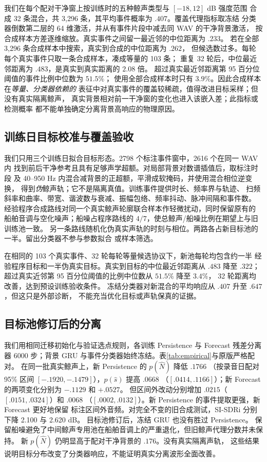\documentclass[conference]{IEEEtran}
\begin{document}
我们在每个配对干净窗上按训练时的五种鲸声类型与 $[-18,12]$ dB 强度范围
合成 32 条混合，共 3,296 条，其平均事件概率为 $.407$。覆盖代理指标取冻结
分类器倒数第二层的 64 维激活，并从有事件片段中减去同 WAV 的干净背景激活，
按合成样本方差逐维缩放。真实事件之间留一最近邻的中位距离为 $.233$。
若在全部 3,296 条合成样本中搜索，真实到合成的中位距离为 $.262$，
但候选数过多。每轮每个真实事件只取一条合成样本，凑成等量的 103 条；
重复 32 轮后，中位最近邻距离为 $.483$，是真实到真实距离的 $2.08$ 倍。
超过真实最近邻距离第 95 百分位阈值的事件比例中位数为 $51.5\%$；
使用全部合成样本时只有 $3.9\%$。因此合成样本在\emph{等量、分类器依赖的}
表征中对真实事件的覆盖较稀疏，值得改进目标采样；但没有真实隔离鲸声，
真实背景相对前一干净窗的变化也进入该嵌入差；此指标或检测概率
都不能单独确定分离背景高响应的物理原因。

\subsection{训练日目标校准与覆盖验收}
我们只用三个训练日拟合目标形态。2798 个标注事件窗中，2616 个在同一 WAV 内
找到前后干净参考且具有足够声学超额。对局部背景对数谱插值后，取标注时段
及 40--950 Hz 内混合减背景的正超额，平滑成软掩码，并使用混合相位逆变换，
得到\emph{伪}鲸声轨；它不是隔离真值。训练事件提供时长、频率界与轨迹、
扫频斜率和曲率、带宽、谐波数与衰减、振幅包络、频率抖动、脉冲间隔和事件数。
经验程序合成路线对同一个真实鲸声轮廓联合样本作轻微扰动，同时保留原有的
船舶音调与空化噪声；船噪占程序路线的 $4/7$，使总鲸声/船噪比例在期望上与旧训练池一致。
另一条路线随机化伪真实声轨的时刻与相位。两路各占新目标池的一半。留出分类器不参与参数拟合
或样本筛选。

在相同的 103 个真实事件、32 轮每轮等量候选协议下，新池每轮均包含约一半
经验程序目标和一半伪真实目标。真实到目标的中位最近邻距离从 $.483$ 降至 $.322$；
超过真实近邻第 95 百分位阈值的比例中位数从 $51.5\%$ 降至 $3.4\%$，
32 轮距离均改善，达到预设训练验收条件。
冻结分类器对新混合的平均响应从 $.407$ 升至 $.647$，但这只是外部诊断，
不能充当优化目标或声轨保真的证据。

\balance
\subsection{目标池修订后的分离}
我们用相同迁移初始化与验证选点规则，各训练 Persistence 与 Forecast 残差分离器
6000 步；背景 GRU 与事件分类器始终冻结。表\ref{tab:empirical}与原版严格配对。
在同一批真实鲸声上，新 Persistence 的 $p(\hat N)$ 降低 $.1766$
（按录音日配对 95\% 区间 $[-.1920,-.1479]$），$p(\hat s)$ 提高 $.0668$
（$[.0414,.1166]$）；新 Forecast 的两项变化分别为 $-.1129$ 和 $+.0527$。
但区间外改动分别增加 $.0215$（$[.0151,.0324]$）和 $.0068$
（$[.0002,.0132]$）。新 Persistence 的事件提取更强，新 Forecast 更好地保留
标注区间外音频。对完全不变的旧合成测试，SI-SDRi 分别下降 2.100 与 2.620 dB。
目标池修订后，冻结 GRU 也没有胜过 Persistence。
保留船噪避免了中间鲸声专用池在船舶音调上的严重退化，但旧鲸声代理分数并未保持。
新 $p(\hat N)$ 仍明显高于配对干净背景的 $.176$。没有真实隔离声轨，
这些结果说明目标分布改变了分类器响应，不能证明真实分离波形全面改善。
\end{document}
